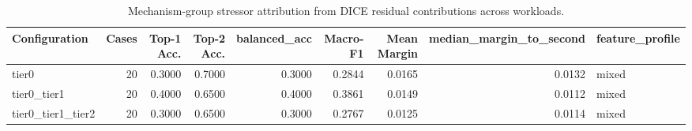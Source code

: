 \begin{table}[t]
\centering
\caption{Mechanism-group stressor attribution from DICE residual contributions across workloads.}
\label{tab:dice_stressor_diagnosis}
\footnotesize
\begin{tabular}{lrrrrrrrl}
\toprule
Configuration & Cases & Top-1 Acc. & Top-2 Acc. & balanced_acc & Macro-F1 & Mean Margin & median_margin_to_second & feature_profile \\
\midrule
tier0 & 20 & 0.3000 & 0.7000 & 0.3000 & 0.2844 & 0.0165 & 0.0132 & mixed \\
tier0_tier1 & 20 & 0.4000 & 0.6500 & 0.4000 & 0.3861 & 0.0149 & 0.0112 & mixed \\
tier0_tier1_tier2 & 20 & 0.3000 & 0.6500 & 0.3000 & 0.2767 & 0.0125 & 0.0114 & mixed \\
\bottomrule
\end{tabular}

\end{table}
